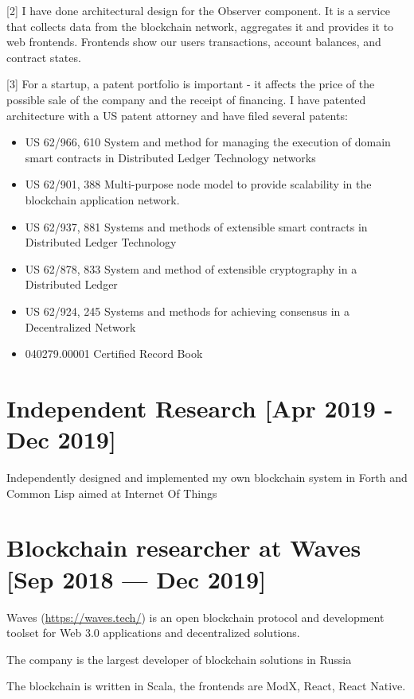 \documentclass[11pt]{article}
\begin{document}
[2] I have done architectural design for the Observer
component. It is a service that collects data from the
blockchain network, aggregates it and provides it to web
frontends. Frontends show our users transactions, account
balances, and contract states.

[3] For a startup, a patent portfolio is important - it
affects the price of the possible sale of the company and
the receipt of financing. I have patented architecture with
a US patent attorney and have filed several patents:
\begin{itemize}
\item US 62/966, 610 System and method for managing the
execution of domain smart contracts in Distributed
Ledger Technology networks
\item US 62/901, 388 Multi-purpose node model to provide
scalability in the blockchain application network.
\item US 62/937, 881 Systems and methods of extensible smart
contracts in Distributed Ledger Technology
\item US 62/878, 833 System and method of extensible
cryptography in a Distributed Ledger
\item US 62/924, 245 Systems and methods for achieving
consensus in a Decentralized Network
\item 040279.00001 Certified Record Book
\end{itemize}

\section{\textbf{Independent Research} [Apr 2019 - Dec 2019]}
\label{sec:org15eff1a}

Independently designed and implemented my own blockchain
system in Forth and Common Lisp aimed at Internet Of Things

\section{\textbf{Blockchain researcher} at \textbf{Waves} [Sep 2018 — Dec 2019]}
\label{sec:org43fdc05}

Waves (\url{https://waves.tech/}) is an open blockchain protocol
and development toolset for Web 3.0 applications and
decentralized solutions.

The company is the largest developer of blockchain solutions
in Russia

The blockchain is written in Scala, the frontends are ModX,
React, React Native.
\end{document}
